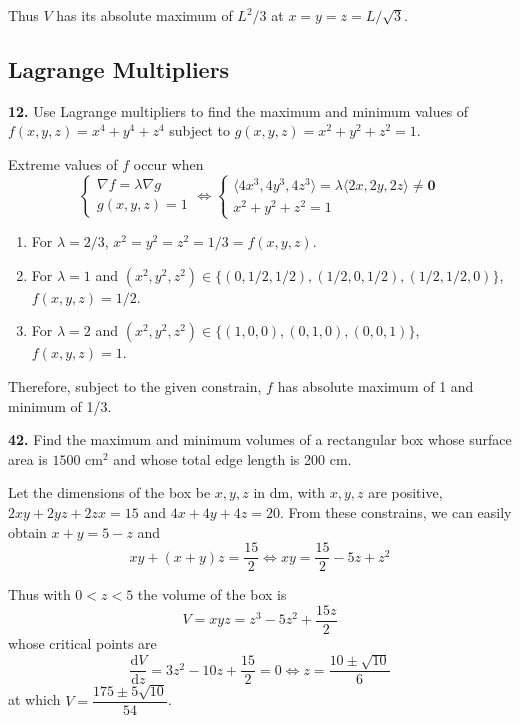 \documentclass[a4paper,12pt]{article}
\newcommand{\leibniz}[3][]{\dfrac{\mathrm{d} #1 #2}{\mathrm{d} #3 #1}}
\newcommand{\exercise}[1]{\noindent\textbf{#1.}}
\begin{document}
Thus $V$ has its absolute maximum of $L^2/3$ at $x = y = z = L/\sqrt 3$.

\subsection{Lagrange Multipliers}
\exercise{12} Use Lagrange multipliers to find the maximum and minimum values
of $f(x, y, z) = x^4 + y^4 + z^4$ subject to $g(x, y, z) = x^2 + y^2 + z^2 = 1$.

Extreme values of $f$ occur when
\[\begin{cases}
  \nabla f = \lambda\nabla g\\
  g(x, y, z) = 1
\end{cases}
\iff\begin{cases}
  \langle 4x^3, 4y^3, 4z^3\rangle
  = \lambda\langle 2x, 2y, 2z\rangle \neq \mathbf 0\\
  x^2 + y^2 + z^2 = 1
\end{cases}\]

\begin{enumerate}
  \item For $\lambda = 2/3$, $x^2 = y^2 = z^2 = 1/3 = f(x, y, z)$.
  \item For $\lambda = 1$ and $(x^2, y^2, z^2) \in \{(0, 1/2, 1/2),
    (1/2, 0, 1/2), (1/2, 1/2, 0)\}$, $f(x, y, z) = 1/2$.
  \item For $\lambda = 2$ and $(x^2, y^2, z^2) \in \{(1, 0, 0),
    (0, 1, 0), (0, 0, 1)\}$, $f(x, y, z) = 1$.
\end{enumerate}

Therefore, subject to the given constrain, $f$ has absolute maximum of 1
and minimum of 1/3.\pagebreak

\exercise{42} Find the maximum and minimum volumes of a rectangular box
whose surface area is $1500\text{ cm}^2$ and whose total edge length is 200 cm.

Let the dimensions of the box be $x, y, z$ in dm, with $x, y, z$ are positive,
$2xy + 2yz + 2zx = 15$ and $4x + 4y + 4z = 20$. From these constrains,
we can easily obtain $x + y = 5 - z$ and
\[xy + (x + y)z = \frac{15}{2} \iff xy = \frac{15}{2} - 5z + z^2\]

Thus with $0 < z < 5$ the volume of the box is
\[V = xyz = z^3 - 5z^2 + \frac{15z}{2}\]
whose critical points are
\[\leibniz{V}{z} = 3z^2 - 10z + \frac{15}{2} = 0
\iff z = \frac{10 \pm \sqrt{10}}{6}\]
at which $V = \dfrac{175 \pm 5\sqrt{10}}{54}$.
\end{document}
